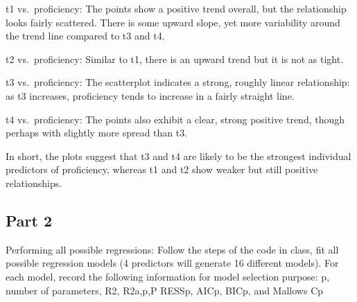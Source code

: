 \documentclass[
]{article}
\begin{document}
t1 vs.~proficiency: The points show a positive trend overall, but the
relationship looks fairly scattered. There is some upward slope, yet
more variability around the trend line compared to t3 and t4.

t2 vs.~proficiency: Similar to t1, there is an upward trend but it is
not as tight.

t3 vs.~proficiency: The scatterplot indicates a strong, roughly linear
relationship: as t3 increases, proficiency tends to increase in a fairly
straight line.

t4 vs.~proficiency: The points also exhibit a clear, strong positive
trend, though perhaps with slightly more spread than t3.

In short, the plots suggest that t3 and t4 are likely to be the
strongest individual predictors of proficiency, whereas t1 and t2 show
weaker but still positive relationships.

\subsection{Part 2}\label{part-2}

Performing all possible regressions: Follow the steps of the code in
class, fit all possible regression models (4 predictors will generate 16
different models). For each model, record the following information for
model selection purpose: p, number of parameters, R2, R2a,p,P RESSp,
AICp, BICp, and Mallows Cp
\end{document}
